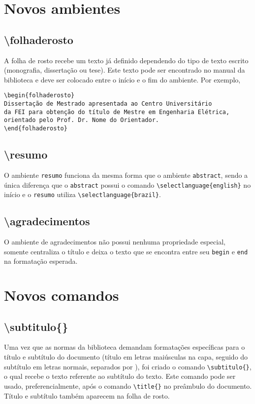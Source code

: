 \section{Novos ambientes}

    \subsection{\textbackslash folhaderosto}
    A folha de rosto recebe um texto já definido dependendo do tipo de texto escrito (monografia, dissertação ou tese). Este texto pode ser encontrado no manual da biblioteca e deve ser colocado entre o início e o fim do ambiente. Por exemplo,
    \begin{verbatim}
\begin{folhaderosto}
Dissertação de Mestrado apresentada ao Centro Universitário
da FEI para obtenção do título de Mestre em Engenharia Elétrica, 
orientado pelo Prof. Dr. Nome do Orientador. 
\end{folhaderosto}
    \end{verbatim}

    \subsection{\textbackslash resumo}
    O ambiente \verb+resumo+ funciona da mesma forma que o ambiente \verb+abstract+, sendo a única diferença que o \verb+abstract+ possui o comando \verb+\selectlanguage{english}+ no início e o \verb+resumo+ utiliza \verb+\selectlanguage{brazil}+.

    \subsection{\textbackslash agradecimentos}
    O ambiente de agradecimentos não possui nenhuma propriedade especial, somente centraliza o título e deixa o texto que se encontra entre seu \verb+begin+ e \verb+end+ na formatação esperada.

\section{Novos comandos}
    
    \subsection{\textbackslash subtitulo\{\}}
    Uma vez que as normas da biblioteca demandam formatações específicas para o título e subtítulo do documento (título em letras maiúsculas na capa, seguido do subtítulo em letras normais, separados por \aspas{:}), foi criado o comando \verb+\subtitulo{}+, o qual recebe o texto referente ao subtítulo do texto. Este comando pode ser usado, preferencialmente, após o comando \verb+\title{}+ no preâmbulo do documento. Título e subtítulo também aparecem na folha de rosto.
    

